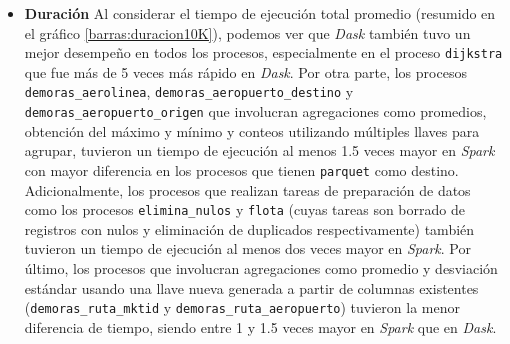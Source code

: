 \begin{itemize}
	\item \textbf{Duración} Al considerar el tiempo de ejecución total promedio (resumido en el gráfico \ref{barras:duracion10K}), podemos ver que \textit{Dask} también tuvo un mejor desempeño en todos los procesos, especialmente en el proceso \texttt{dijkstra} que fue más de 5 veces más rápido en \textit{Dask}. Por otra parte, los procesos \texttt{demoras\_aerolinea}, \texttt{demoras\_aeropuerto\_destino} y \texttt{demoras\_aeropuerto\_origen} que involucran agregaciones como promedios, obtención del máximo y mínimo y conteos utilizando múltiples llaves para agrupar, tuvieron un tiempo de ejecución al menos 1.5 veces mayor en \textit{Spark} con mayor diferencia en los procesos que tienen \texttt{parquet} como destino. Adicionalmente, los procesos que realizan tareas de preparación de datos como los procesos \texttt{elimina\_nulos} y \texttt{flota} (cuyas tareas son borrado de registros con nulos y eliminación de duplicados respectivamente) también tuvieron un tiempo de ejecución al menos dos veces mayor en \textit{Spark}. Por último, los procesos que involucran agregaciones como promedio y desviación estándar usando una llave nueva generada a partir de columnas existentes (\texttt{demoras\_ruta\_mktid} y \texttt{demoras\_ruta\_aeropuerto}) tuvieron la menor diferencia de tiempo, siendo entre 1 y 1.5 veces mayor en \textit{Spark} que en \textit{Dask}.  
	
\end{itemize}


